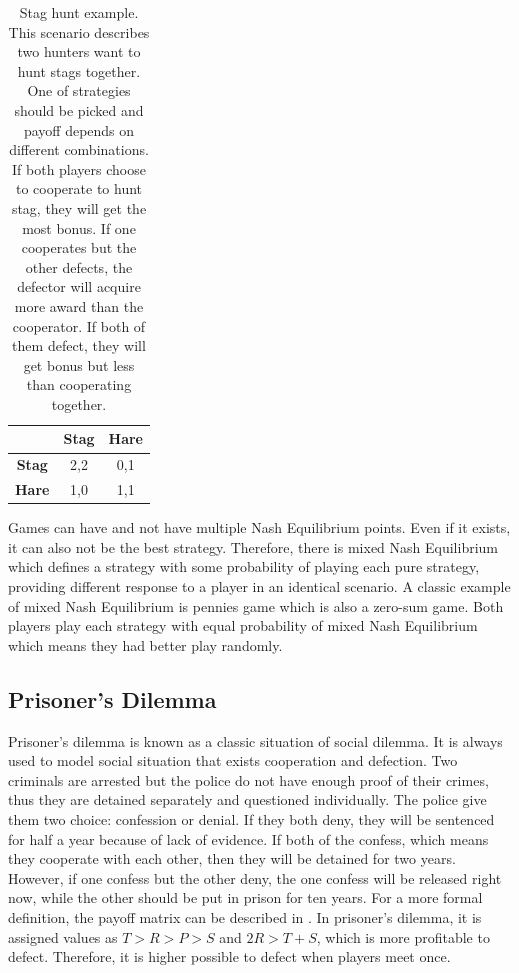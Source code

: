 \begin{table}[!htb]
  \centering
  \begin{tabular}{c | c | c}
  \toprule
  \textbf{} & \textbf{Stag} & \textbf{Hare}\\
  \midrule
  \textbf{Stag} & 2,2 & 0,1\\
  \midrule
  \textbf{Hare} & 1,0 & 1,1\\
  \bottomrule
  \end{tabular}
  \caption{Stag hunt example. This scenario describes two hunters want to hunt stags together. One of strategies should be picked and payoff depends on different combinations. If both players choose to cooperate to hunt stag, they will get the most bonus. If one cooperates but the other defects, the defector will acquire more award than the cooperator. If both of them defect, they will get bonus but less than cooperating together.}
  \label{Table:tabex}
\end{table}

Games can have and not have multiple Nash Equilibrium points. Even if it exists, it can also not be the best strategy. Therefore, there is mixed Nash Equilibrium which defines a strategy with some probability of playing each pure strategy, providing different response to a player in an identical scenario. A classic example of mixed Nash Equilibrium is pennies game which is also a zero-sum game. Both players play each strategy with equal probability of mixed Nash Equilibrium which means they had better play randomly.

\subsection{Prisoner's Dilemma}
Prisoner's dilemma is known as a classic situation of social dilemma. It is always used to model social situation that exists cooperation and defection. Two criminals are arrested  but the police do not have enough proof of their crimes, thus they are detained separately and questioned individually. The police give them two choice: confession or denial. If they both deny, they will be sentenced for half a year because of lack of evidence. If both of the confess, which means they cooperate with each other, then they will be detained for two years. However, if one confess but the other deny, the one confess will be released right now, while the other should be put in prison for ten years. For a more formal definition, the payoff matrix can be described in . In prisoner's dilemma, it is assigned values as $T > R > P > S$ and $2R > T + S$, which is more profitable to defect. Therefore, it is higher possible to defect when players meet once.

